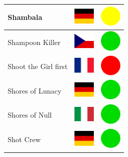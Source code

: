 \documentclass[12pt, a4paper, twoside]{report}
\begin{document}
\begin{center}
\begin{longtable}{|p{5cm}|p{2cm}|p{2cm}|}
 Shambala                                                   & \includegraphics[width=1cm]{../4x3/de} &   \includegraphics[width=1cm]{../likes/m} \\ \hline
 Shampoon Killer                                            & \includegraphics[width=1cm]{../4x3/cz} &   \includegraphics[width=1cm]{../likes/y} \\ \hline
 Shoot the Girl first                                       & \includegraphics[width=1cm]{../4x3/fr} &   \includegraphics[width=1cm]{../likes/n} \\ \hline
 Shores of Lunacy                                           & \includegraphics[width=1cm]{../4x3/de} &   \includegraphics[width=1cm]{../likes/y} \\ \hline
 Shores of Null                                             & \includegraphics[width=1cm]{../4x3/it} &   \includegraphics[width=1cm]{../likes/y} \\ \hline
 Shot Crew                                                  & \includegraphics[width=1cm]{../4x3/de} &   \includegraphics[width=1cm]{../likes/y} \\ \hline

\end{longtable}
\end{center}
\end{document}

